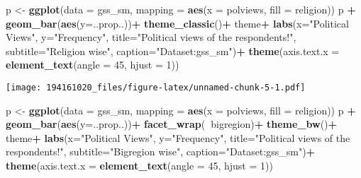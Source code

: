 \documentclass[
]{article}
\newenvironment{Shaded}{\begin{snugshade}}{\end{snugshade}}
\newcommand{\DataTypeTok}[1]{\textcolor[rgb]{0.13,0.29,0.53}{#1}}
\newcommand{\DecValTok}[1]{\textcolor[rgb]{0.00,0.00,0.81}{#1}}
\newcommand{\KeywordTok}[1]{\textcolor[rgb]{0.13,0.29,0.53}{\textbf{#1}}}
\newcommand{\NormalTok}[1]{#1}
\newcommand{\OperatorTok}[1]{\textcolor[rgb]{0.81,0.36,0.00}{\textbf{#1}}}
\newcommand{\StringTok}[1]{\textcolor[rgb]{0.31,0.60,0.02}{#1}}
\begin{document}
\begin{Shaded}
\begin{Highlighting}[]
\NormalTok{p <-}\StringTok{ }\KeywordTok{ggplot}\NormalTok{(}\DataTypeTok{data =}\NormalTok{ gss_sm,}
            \DataTypeTok{mapping =} \KeywordTok{aes}\NormalTok{(}\DataTypeTok{x =}\NormalTok{ polviews, }
                          \DataTypeTok{fill =}\NormalTok{ religion))}
\NormalTok{p }\OperatorTok{+}\StringTok{ }\KeywordTok{geom_bar}\NormalTok{(}\KeywordTok{aes}\NormalTok{(}\DataTypeTok{y=}\NormalTok{..prop..))}\OperatorTok{+}
\StringTok{  }\KeywordTok{theme_classic}\NormalTok{()}\OperatorTok{+}
\StringTok{  }\NormalTok{theme}\OperatorTok{+}
\StringTok{  }\KeywordTok{labs}\NormalTok{(}\DataTypeTok{x=}\StringTok{"Political Views"}\NormalTok{, }\DataTypeTok{y=}\StringTok{"Frequency"}\NormalTok{, }
       \DataTypeTok{title=}\StringTok{"Political views of the respondents!"}\NormalTok{,}
       \DataTypeTok{subtitle=}\StringTok{"Religion wise"}\NormalTok{, }
       \DataTypeTok{caption=}\StringTok{"Dataset:gss_sm"}\NormalTok{)}\OperatorTok{+}
\StringTok{  }\KeywordTok{theme}\NormalTok{(}\DataTypeTok{axis.text.x =} \KeywordTok{element_text}\NormalTok{(}\DataTypeTok{angle =} \DecValTok{45}\NormalTok{, }\DataTypeTok{hjust =} \DecValTok{1}\NormalTok{))}
\end{Highlighting}
\end{Shaded}

\texttt{[image: 194161020\_files/figure-latex/unnamed-chunk-5-1.pdf]}

\begin{Shaded}
\begin{Highlighting}[]
\NormalTok{p <-}\StringTok{ }\KeywordTok{ggplot}\NormalTok{(}\DataTypeTok{data =}\NormalTok{ gss_sm,}
            \DataTypeTok{mapping =} \KeywordTok{aes}\NormalTok{(}\DataTypeTok{x =}\NormalTok{ polviews, }\DataTypeTok{fill =}\NormalTok{ religion))}
\NormalTok{p }\OperatorTok{+}\StringTok{ }\KeywordTok{geom_bar}\NormalTok{(}\KeywordTok{aes}\NormalTok{(}\DataTypeTok{y=}\NormalTok{..prop..))}\OperatorTok{+}
\StringTok{  }\KeywordTok{facet_wrap}\NormalTok{(}\OperatorTok{~}\NormalTok{bigregion)}\OperatorTok{+}
\StringTok{  }\KeywordTok{theme_bw}\NormalTok{()}\OperatorTok{+}
\StringTok{  }\NormalTok{theme}\OperatorTok{+}
\StringTok{  }\KeywordTok{labs}\NormalTok{(}\DataTypeTok{x=}\StringTok{"Political Views"}\NormalTok{, }\DataTypeTok{y=}\StringTok{"Frequency"}\NormalTok{, }
       \DataTypeTok{title=}\StringTok{"Political views of the respondents!"}\NormalTok{, }\DataTypeTok{subtitle=}\StringTok{"Bigregion wise"}\NormalTok{, }
       \DataTypeTok{caption=}\StringTok{"Dataset:gss_sm"}\NormalTok{)}\OperatorTok{+}
\StringTok{  }\KeywordTok{theme}\NormalTok{(}\DataTypeTok{axis.text.x =} \KeywordTok{element_text}\NormalTok{(}\DataTypeTok{angle =} \DecValTok{45}\NormalTok{, }\DataTypeTok{hjust =} \DecValTok{1}\NormalTok{))}
\end{Highlighting}
\end{Shaded}
\end{document}
